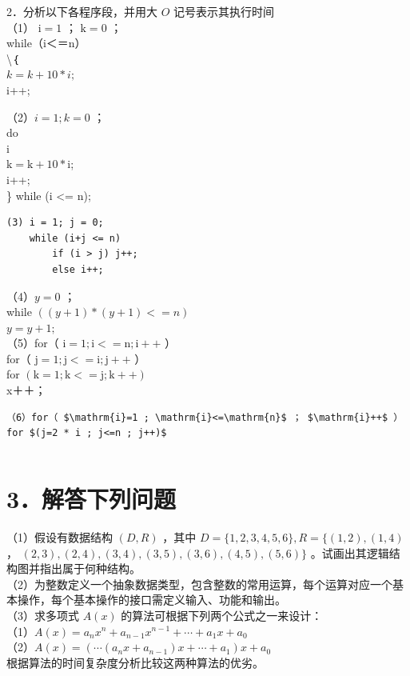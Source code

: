 \documentclass[10pt]{article}
\begin{document}
2．分析以下各程序段，并用大 $O$ 记号表示其执行时间\\
（1） $\mathrm{i}=1$ ； $\mathrm{k}=0$ ；\\
while（i＜＝n）\\
\textbackslash ｛\\
$k=k+10 * i ;$\\
i++;

（2）$i=1 ; k=0$ ；\\
do\\
i\\
$\mathrm{k}=\mathrm{k}+10 * \mathrm{i}$;\\
i++;\\
\} while (i <= n);

\begin{verbatim}
(3) i = 1; j = 0;
    while (i+j <= n)
        if (i > j) j++;
        else i++;
\end{verbatim}

（4）$y=0$ ；\\
while $((y+1) *(y+1)<=n)$\\
$y=y+1 ;$\\
（5）for（ $\mathrm{i}=1 ; \mathrm{i}<=\mathrm{n} ; \mathrm{i}++$ ）\\
for（ $\mathrm{j}=1 ; \mathrm{j}<=\mathrm{i} ; \mathrm{j}++$ ）\\
for $(\mathrm{k}=1 ; \mathrm{k}<=\mathrm{j} ; \mathrm{k}++)$\\
x＋＋；

\begin{verbatim}
（6）for（ $\mathrm{i}=1 ; \mathrm{i}<=\mathrm{n}$ ； $\mathrm{i}++$ ）
for $(j=2 * i ; j<=n ; j++)$
\end{verbatim}

\begin{verbatim}

\end{verbatim}

\section*{3．解答下列问题}
（1）假设有数据结构 $(D, R)$ ，其中 $D=\{1,2,3,4,5,6\}, R=\{(1,2),(1,4)$ ， $(2,3),(2,4),(3,4),(3,5),(3,6),(4,5),(5,6)\}$ 。试画出其逻辑结构图并指出属于何种结构。\\
（2）为整数定义一个抽象数据类型，包含整数的常用运算，每个运算对应一个基本操作，每个基本操作的接口需定义输入、功能和输出。\\
（3）求多项式 $A(x)$ 的算法可根据下列两个公式之一来设计：\\
（1）$A(x)=a_{n} x^{n}+a_{n-1} x^{n-1}+\cdots+a_{1} x+a_{0}$\\
（2）$A(x)=\left(\cdots\left(a_{n} x+a_{n-1}\right) x+\cdots+a_{1}\right) x+a_{0}$\\
根据算法的时间复杂度分析比较这两种算法的优劣。
\end{document}

